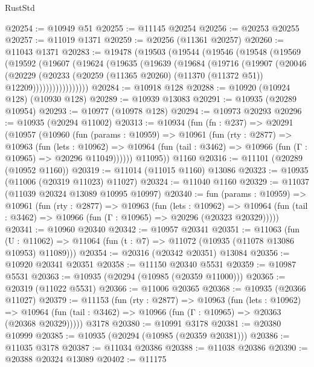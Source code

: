 \begin{lexlean}{RustStd}
\begin{coremodule}
{\begin{coremodule}
{{{{{{{{{{{{{{{{{{{{{{{{{{{{{{{{{{{{{{{{{{{{{{{{{{{{{{{{{{{{{{{{{{{{{{{{{{{{{{{{{{{{{@20254 := @10949 @51
@20255 := @11145 @20254
@20256 := @20253 @20255
@20257 := @11019 @1371
@20259 := @20256 (@11361 @20257)
@20260 := @11043 @1371
@20283 := @19478
    (@19503
      (@19544
        (@19546
          (@19548
            (@19569
              (@19592
                (@19607
                  (@19624
                    (@19635
                      (@19639
                        (@19684
                          (@19716
                            (@19907
                              (@20046
                                (@20229
                                  (@20233
                                    (@20259
                                      (@11365 @20260)
                                      (@11370 (@11372 @51))
                                      @12209)))))))))))))))))
@20284 := @10918 @128
@20288 := @10920 (@10924 @128) (@10930 @128)
@20289 := @10939 @13083
@20291 := @10935 (@20289 @10954)
@20293 := @10977 (@10978 @128)
@20294 := @10973 @20293
@20296 := @10935 (@20294 @11002)
@20313 := @10934
    (fun (fn : @237) =>
    @20291
      (@10957
        (@10960
          (fun (params : @10959) =>
          @10961
            (fun (rty : @2877) =>
            @10963
              (fun (lets : @10962) =>
              @10964 (fun (tail : @3462) => @10966 (fun (Γ : @10965) => @20296 @11049))))))
        @11095))
    @1160
@20316 := @11101 (@20289 (@10952 @1160))
@20319 := @11014 (@11015 @1160) @13086
@20323 := @10935 (@11006 (@20319 @11023) @11027)
@20324 := @11040 @1160
@20329 := @11037 (@11039 @20324 @13089 @10995 @10997)
@20340 := fun (params : @10959) =>
  @10961
    (fun (rty : @2877) =>
    @10963
      (fun (lets : @10962) =>
      @10964 (fun (tail : @3462) => @10966 (fun (Γ : @10965) => @20296 (@20323 @20329)))))
@20341 := @10960 @20340
@20342 := @10957 @20341
@20351 := @11063
    (fun (U : @11062) => @11064 (fun (t : @7) => @11072 (@10935 (@11078 @13086 @10953) @11089)))
@20354 := @20316 (@20342 @20351) @13084
@20356 := @10920 @20341 @20351
@20358 := @11150 @20340 @5531
@20359 := @10987 @5531
@20363 := @10935 (@20294 (@10985 (@20359 @11000)))
@20365 := @20319 (@11022 @5531)
@20366 := @11006 @20365
@20368 := @10935 (@20366 @11027)
@20379 := @11153
    (fun (rty : @2877) =>
    @10963
      (fun (lets : @10962) =>
      @10964 (fun (tail : @3462) => @10966 (fun (Γ : @10965) => @20363 (@20368 @20329)))))
    @3178
@20380 := @10991 @3178
@20381 := @20380 @10999
@20385 := @10935 (@20294 (@10985 (@20359 @20381)))
@20386 := @11035 @3178
@20387 := @11034 @20386
@20388 := @11038 @20386
@20390 := @20388 @20324 @13089
@20402 := @11175
}}}}}}}}}}}}}}}}}}}}}}}}}}}}}}}}}}}}}}}}}}}}}}}}}}}}}}}}}}}}}}}}}}}}}}}}}}}}}}}}}}}}}
\end{coremodule}}
\end{coremodule}
\end{lexlean}
